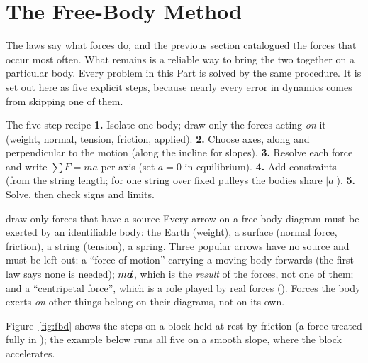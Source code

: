 \section{The Free-Body Method}

The laws say what forces do, and the previous section catalogued the forces that occur most often. What
remains is a reliable way to bring the two together on a particular body. Every problem in this Part is
solved by the same procedure. It is set out here as five explicit steps, because nearly every error in dynamics
comes from skipping one of them.

\begin{methodbox}{The five-step recipe}
\textbf{1.} Isolate one body; draw only the forces acting \emph{on} it (weight, normal, tension,
friction, applied). \textbf{2.} Choose axes, along and perpendicular to the motion (along the incline
for slopes). \textbf{3.} Resolve each force and write $\sum F=ma$ per axis (set $a=0$ in equilibrium).
\textbf{4.} Add constraints (from the string length; for one string over fixed pulleys the bodies
share $|a|$). \textbf{5.} Solve, then check signs and
limits.
\end{methodbox}

\begin{trapbox}{draw only forces that have a source}
Every arrow on a free-body diagram must be exerted by an identifiable body: the Earth (weight), a
surface (normal force, friction), a string (tension), a spring. Three popular arrows have no source and
must be left out: a ``force of motion'' carrying a moving body forwards (the first law says none is
needed); $m\vec{\bm{a}}$, which is the \emph{result} of the forces, not one of them; and a ``centripetal force'',
which is a role played by real forces (). Forces the body exerts \emph{on} other
things belong on their diagrams, not on its own.
\end{trapbox}

\begin{figure}[htbp]
\centering
{}
\end{figure}

Figure~\ref{fig:fbd} shows the steps on a block held at rest by friction (a force treated fully in
); the example below runs all five on a smooth slope, where the block accelerates.

